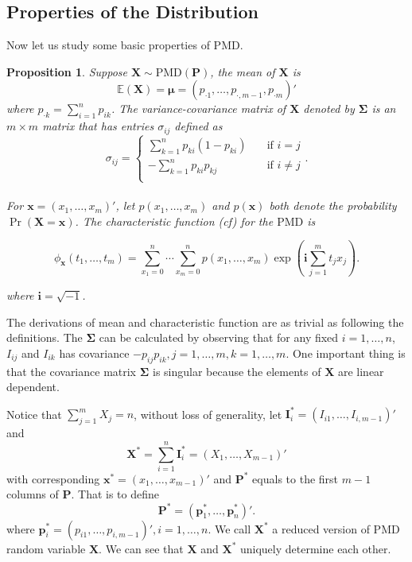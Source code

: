 \documentclass[12pt]{article}
\newcommand{\Ivec}{{\boldsymbol{I}}}
\newcommand{\EE}{\mathbb{E}}
\newcommand{\Xmat}{\mathbf{X}}
\newcommand{\Pmat}{\mathbf{P}}
\newcommand{\pvec}{\boldsymbol{p}}
\newcommand{\ivec}{{\boldsymbol{i}}}
\newcommand{\PMD}{\textrm{PMD}}
\newcommand{\Xvec}{\boldsymbol{X}}
\newcommand{\xvec}{\boldsymbol{x}}
\newcommand{\muvec}{\boldsymbol{\mu}}
\newcommand{\Sig}{\boldsymbol{\Sigma}}
\newcommand{\qedw}{\hfill \ensuremath{\Box}}
\newtheorem{ppt}{Proposition}
\begin{document}
\subsection{Properties of the Distribution}
Now let us study some basic properties of $\PMD$. 

\begin{ppt}%
Suppose $\Xmat \sim \PMD (\Pmat)$, the mean of $\Xmat$ is
   $$\EE(\Xmat) = \muvec = \left( p_{\cdot1} ,\dots,p_{\cdot,m-1},p_{\cdot m}\right)'$$ where $p_{\cdot k} = \sum_{i=1}^{n}p_{i k}$.
The variance-covariance matrix of $\Xvec$ denoted by $\Sig$ is an $m \times m$ matrix that has entries $\sigma_{ij}$ defined as
\begin{equation*}
   \sigma_{ij} =
           \begin{cases}
             \sum_{k=1}^{n}p_{ki}(1-p_{ki}) & \quad \text{if } i=j\\
             -\sum_{k=1}^{n}p_{ki}p_{kj} & \quad \text{if } i \neq j\\
           \end{cases}.
\end{equation*}\\
For $\xvec = (x_1, \dots, x_m)'$, let $p(x_1,\ldots,x_{m})$ and $p(\xvec)$ both denote the probability $\Pr \left(\Xvec = \xvec \right)$. The characteristic function (cf) for the $\PMD$ is

\begin{equation*}
\phi_{\xvec}(t_1, \dots, t_{m})  =  \sum_{x_1 = 0}^{n} \cdots \sum_{x_{m} = 0}^n p(x_1,\ldots,x_{m})\exp\left(\ivec\sum_{j=1}^{m}t_jx_j\right).
\end{equation*}

where  $\ivec=\sqrt{-1}$.
\end{ppt}
The derivations of mean and characteristic function are as trivial as following the definitions. The $\Sig$ can be calculated by observing that for any fixed $i=1,\dots,n$, $I_{ij}$ and $I_{ik}$ has covariance $-p_{ij}p_{ik},j=1,\dots,m,k=1,\dots,m$. One important thing is that the covariance matrix $\Sig$ is singular because the elements of $\Xvec$ are linear dependent.

Notice that $\sum_{j=1}^{m}X_j = n$, without loss of generality, let $\Ivec_i^{\ast} = (I_{i1},\dots,I_{i,m-1})'$ and
 $$\Xvec^{\ast}=\sum_{i=1}^{n}\Ivec_{i}^{\ast}=(X_1,\dots,X_{m-1})'$$
  with corresponding $\xvec^{\ast} = (x_1,\dots,x_{m-1})'$ and $\Pmat^{\ast}$ equals to the first $m-1$ columns of $\Pmat$. That is to define
$$
\Pmat^{\ast} = \left(\pvec_1^{\ast},\dots, \pvec_n^{\ast} \right)'.
$$
where $\pvec_{i}^{\ast} = \left(p_{i1},\dots,p_{i,m-1} \right)', i = 1,\dots,n$. We call $\Xvec^{\ast}$ a reduced version of $\PMD$ random variable $\Xvec$. We can see that $\Xvec$ and $\Xvec^{\ast}$ uniquely determine each other.
\end{document}

